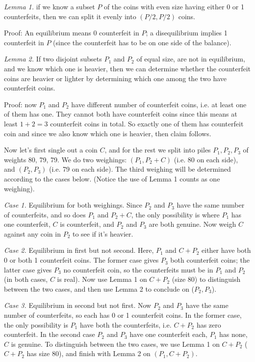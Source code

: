 \documentclass[11pt,a4paper]{article}
\begin{document}
\begin{enumerate}
    \emph{Lemma 1.} if we know a subset $P$ of the coins with even size having either 0 or 1 counterfeits, 
    then we can split it evenly into $(P/2, P/2)$ coins. 
    
    Proof: An equilibrium means 0 counterfeit in $P$; a disequilibrium implies 1 counterfeit in $P$ (since the counterfeit has to be on one side of the balance).  
    
    \emph{Lemma 2.} If two disjoint subsets $P_1$ and $P_2$ of equal size, are not in equilibrium, 
    and we know which one is heavier, then we can determine whether the counterfeit coins are heavier or lighter by determining which one among the two have counterfeit coins. 
    
    Proof: now $P_1$ and $P_2$ have different number of counterfeit coins, i.e. at least one of them has one. 
    They cannot both have counterfeit coins since this means at least $1+2=3$ counterfeit coins in total. 
    So exactly one of them has counterfeit coin and since we also know which one is heavier, then claim follows. 
    
    Now let's first single out a coin $C$, and for the rest we split into piles $P_1, P_2, P_3$ of weights 80, 79, 79. 
    We do two weighings: $(P_1, P_2+C)$ (i.e. 80 on each side), and $(P_2, P_3)$ (i.e. 79 on each side). 
    The third weighing will be determined according to the cases below. 
    (Notice the use of Lemma 1 counts as one weighing). 
    
    \emph{Case 1.} Equilibrium for both weighings. 
    Since $P_2$ and $P_3$ have the same number of counterfeits, and so does $P_1$ and $P_2+C$, the only possibility is 
    where $P_1$ has one counterfeit, $C$ is counterfeit, and $P_2$ and $P_3$ are both genuine. 
    Now weigh $C$ against any coin in $P_2$ to see if it's heavier. 
    
    \emph{Case 2.} Equilibrium in first but not second. 
    Here, $P_1$ and $C+P_2$ either have both 0 or both 1 counterfeit coins. 
    The former case gives $P_3$ both counterfeit coins; 
    the latter case gives $P_3$ no counterfeit coin, so the counterfeits must be in $P_1$ and $P_2$
     (in both cases, $C$ is real). 
    Now use Lemma 1 on $C+P_2$ (size 80) to distinguish between the two cases, 
    and then use Lemma 2 to conclude on ($P_2, P_3$). 
    
    \emph{Case 3.} Equilibrium in second but not first. 
    Now $P_2$ and $P_3$ have the same number of counterfeits, 
    so each has 0 or 1 counterfeit coins. 
    In the former case, the only possibility is $P_1$ have both the counterfeits, i.e. $C+P_2$ has zero counterfeit. 
    In the second case $P_2$ and $P_3$ have one counterfeit each, $P_1$ has none, $C$ is genuine. 
    To distinguish between the two cases, we use Lemma 1 on $C+P_2$ ($C+P_2$ has size 80), 
    and finish with Lemma 2 on $(P_1, C+P_2)$. 
    

\end{enumerate}
\end{document}
